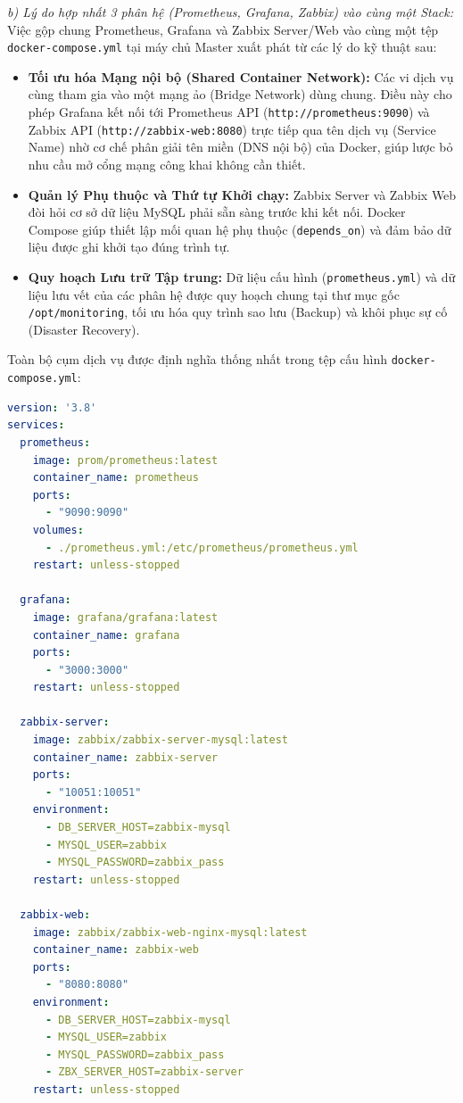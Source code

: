 \documentclass[13pt,a4paper]{extarticle}
\begin{document}
\textit{b) Lý do hợp nhất 3 phân hệ (Prometheus, Grafana, Zabbix) vào cùng một Stack:}\\
Việc gộp chung Prometheus, Grafana và Zabbix Server/Web vào cùng một tệp \texttt{docker-compose.yml} tại máy chủ Master xuất phát từ các lý do kỹ thuật sau:
\begin{itemize}
    \item \textbf{Tối ưu hóa Mạng nội bộ (Shared Container Network):} Các vi dịch vụ cùng tham gia vào một mạng ảo (Bridge Network) dùng chung. Điều này cho phép Grafana kết nối tới Prometheus API (\texttt{http://prometheus:9090}) và Zabbix API (\texttt{http://zabbix-web:8080}) trực tiếp qua tên dịch vụ (Service Name) nhờ cơ chế phân giải tên miền (DNS nội bộ) của Docker, giúp lược bỏ nhu cầu mở cổng mạng công khai không cần thiết.
    \item \textbf{Quản lý Phụ thuộc và Thứ tự Khởi chạy:} Zabbix Server và Zabbix Web đòi hỏi cơ sở dữ liệu MySQL phải sẵn sàng trước khi kết nối. Docker Compose giúp thiết lập mối quan hệ phụ thuộc (\texttt{depends\_on}) và đảm bảo dữ liệu được ghi khởi tạo đúng trình tự.
    \item \textbf{Quy hoạch Lưu trữ Tập trung:} Dữ liệu cấu hình (\texttt{prometheus.yml}) và dữ liệu lưu vết của các phân hệ được quy hoạch chung tại thư mục gốc \texttt{/opt/monitoring}, tối ưu hóa quy trình sao lưu (Backup) và khôi phục sự cố (Disaster Recovery).
\end{itemize}

Toàn bộ cụm dịch vụ được định nghĩa thống nhất trong tệp cấu hình \texttt{docker-compose.yml}:

\begin{lstlisting}[language=yaml]
version: '3.8'
services:
  prometheus:
    image: prom/prometheus:latest
    container_name: prometheus
    ports:
      - "9090:9090"
    volumes:
      - ./prometheus.yml:/etc/prometheus/prometheus.yml
    restart: unless-stopped

  grafana:
    image: grafana/grafana:latest
    container_name: grafana
    ports:
      - "3000:3000"
    restart: unless-stopped

  zabbix-server:
    image: zabbix/zabbix-server-mysql:latest
    container_name: zabbix-server
    ports:
      - "10051:10051"
    environment:
      - DB_SERVER_HOST=zabbix-mysql
      - MYSQL_USER=zabbix
      - MYSQL_PASSWORD=zabbix_pass
    restart: unless-stopped

  zabbix-web:
    image: zabbix/zabbix-web-nginx-mysql:latest
    container_name: zabbix-web
    ports:
      - "8080:8080"
    environment:
      - DB_SERVER_HOST=zabbix-mysql
      - MYSQL_USER=zabbix
      - MYSQL_PASSWORD=zabbix_pass
      - ZBX_SERVER_HOST=zabbix-server
    restart: unless-stopped
\end{lstlisting}
\end{document}
